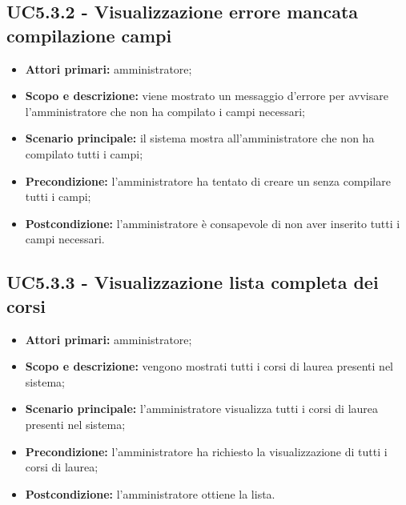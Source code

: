 \documentclass[AnalisiDeiRequisiti.tex]{subfiles}
\begin{document}
\subsection{UC5.3.2 - Visualizzazione errore mancata compilazione campi}
\begin{itemize}
	\item \textbf{Attori primari:} amministratore;
	\item \textbf{Scopo e descrizione:} viene mostrato un messaggio d'errore per avvisare l'amministratore che non ha compilato i campi necessari;
	\item \textbf{Scenario principale:} il sistema mostra all'amministratore che non ha compilato tutti i campi;
	\item \textbf{Precondizione:} l'amministratore ha tentato di creare un  senza compilare tutti i campi; 
	\item \textbf{Postcondizione:} l'amministratore è consapevole di non aver inserito tutti i campi necessari.
\end{itemize}\subsection{UC5.3.3 - Visualizzazione lista completa dei corsi}
\begin{itemize}
	\item \textbf{Attori primari:} amministratore;
	\item \textbf{Scopo e descrizione:} vengono mostrati tutti i corsi di laurea presenti nel sistema;
	\item \textbf{Scenario principale:} l'amministratore visualizza tutti i corsi di laurea presenti nel sistema;
	\item \textbf{Precondizione:} l'amministratore ha richiesto la visualizzazione di tutti i corsi di laurea; 
	\item \textbf{Postcondizione:} l'amministratore ottiene la lista.
\end{itemize}
\end{document}
